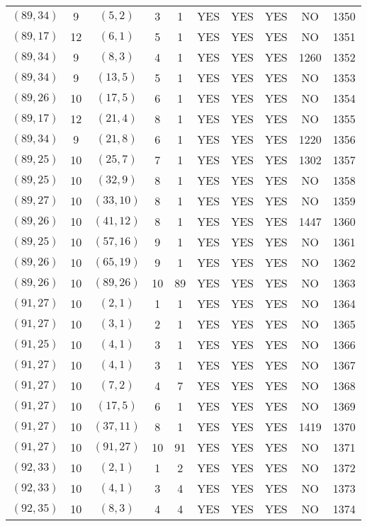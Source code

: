 \begin{longtable}{|c|c|c|c|c|c|c|c|c|c|}
$(89, 34)$ & 9 & $(5, 2)$ & 3 & 1 & YES & YES & YES & NO & 1350\\
$(89, 17)$ & 12 & $(6, 1)$ & 5 & 1 & YES & YES & YES & NO & 1351\\
$(89, 34)$ & 9 & $(8, 3)$ & 4 & 1 & YES & YES & YES & 1260 & 1352\\
$(89, 34)$ & 9 & $(13, 5)$ & 5 & 1 & YES & YES & YES & NO & 1353\\
$(89, 26)$ & 10 & $(17, 5)$ & 6 & 1 & YES & YES & YES & NO & 1354\\
$(89, 17)$ & 12 & $(21, 4)$ & 8 & 1 & YES & YES & YES & NO & 1355\\
$(89, 34)$ & 9 & $(21, 8)$ & 6 & 1 & YES & YES & YES & 1220 & 1356\\
$(89, 25)$ & 10 & $(25, 7)$ & 7 & 1 & YES & YES & YES & 1302 & 1357\\
$(89, 25)$ & 10 & $(32, 9)$ & 8 & 1 & YES & YES & YES & NO & 1358\\
$(89, 27)$ & 10 & $(33, 10)$ & 8 & 1 & YES & YES & YES & NO & 1359\\
$(89, 26)$ & 10 & $(41, 12)$ & 8 & 1 & YES & YES & YES & 1447 & 1360\\
$(89, 25)$ & 10 & $(57, 16)$ & 9 & 1 & YES & YES & YES & NO & 1361\\
$(89, 26)$ & 10 & $(65, 19)$ & 9 & 1 & YES & YES & YES & NO & 1362\\
$(89, 26)$ & 10 & $(89, 26)$ & 10 & 89 & YES & YES & YES & NO & 1363\\
$(91, 27)$ & 10 & $(2, 1)$ & 1 & 1 & YES & YES & YES & NO & 1364\\
$(91, 27)$ & 10 & $(3, 1)$ & 2 & 1 & YES & YES & YES & NO & 1365\\
$(91, 25)$ & 10 & $(4, 1)$ & 3 & 1 & YES & YES & YES & NO & 1366\\
$(91, 27)$ & 10 & $(4, 1)$ & 3 & 1 & YES & YES & YES & NO & 1367\\
$(91, 27)$ & 10 & $(7, 2)$ & 4 & 7 & YES & YES & YES & NO & 1368\\
$(91, 27)$ & 10 & $(17, 5)$ & 6 & 1 & YES & YES & YES & NO & 1369\\
$(91, 27)$ & 10 & $(37, 11)$ & 8 & 1 & YES & YES & YES & 1419 & 1370\\
$(91, 27)$ & 10 & $(91, 27)$ & 10 & 91 & YES & YES & YES & NO & 1371\\
$(92, 33)$ & 10 & $(2, 1)$ & 1 & 2 & YES & YES & YES & NO & 1372\\
$(92, 33)$ & 10 & $(4, 1)$ & 3 & 4 & YES & YES & YES & NO & 1373\\
$(92, 35)$ & 10 & $(8, 3)$ & 4 & 4 & YES & YES & YES & NO & 1374\\

\end{longtable}
